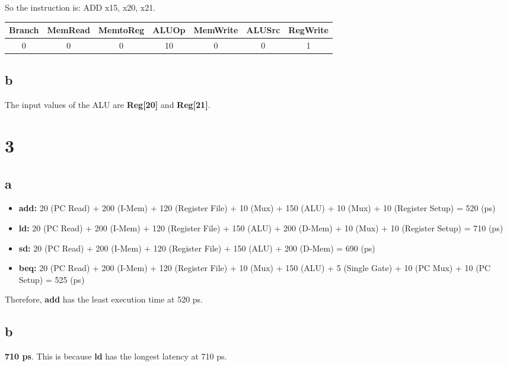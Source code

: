 \documentclass[12pt]{article}
\begin{document}
So the instruction is: ADD x15, x20, x21.

\begin{table}[h!]
    \centering
    \begin{tabular}{|c|c|c|c|c|c|c|}
    \hline
    Branch & MemRead & MemtoReg & ALUOp & MemWrite & ALUSrc & RegWrite \\
    \hline
    0      & 0       & 0        & 10    & 0        & 0      & 1        \\
    \hline
    \end{tabular}
\end{table}

\subsection*{b}

The input values of the ALU are \textbf{Reg[20]} and \textbf{Reg[21]}.

\section*{3}

\subsection*{a}

\begin{itemize}
    \item \textbf{add:} 20 (PC Read) + 200 (I-Mem) + 120 (Register File) + 10 (Mux) + 150 (ALU) + 10 (Mux) + 10 (Register Setup) = 520 (ps)
    \item \textbf{ld:} 20 (PC Read) + 200 (I-Mem) + 120 (Register File) + 150 (ALU) + 200 (D-Mem) + 10 (Mux) + 10 (Register Setup) = 710 (ps)
    \item \textbf{sd:} 20 (PC Read) + 200 (I-Mem) + 120 (Register File) + 150 (ALU) + 200 (D-Mem) = 690 (ps)
    \item \textbf{beq:} 20 (PC Read) + 200 (I-Mem) + 120 (Register File) + 10 (Mux) + 150 (ALU) + 5 (Single Gate) + 10 (PC Mux) + 10 (PC Setup) = 525 (ps)
\end{itemize}

Therefore, \textbf{add} has the least execution time at 520 ps.

\subsection*{b}

\textbf{710 ps}. This is because \textbf{ld} has the longest latency at 710 ps.
\end{document}
